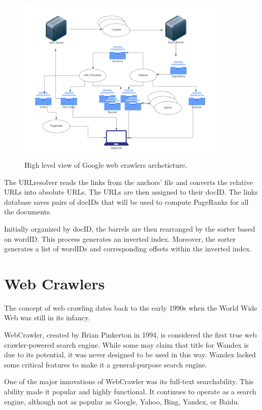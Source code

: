 \begin{figure}[h]	
     \centering
     \includegraphics[width=10cm]{images/google_arch.png}
     \caption{High level view of Google web crawlers archeticture.}
     \label{fig:google-arch}
\end{figure}

The URLresolver reads the links from the anchors' file and converts the relative URLs into absolute URLs. The URLs are then assigned to their docID. The links database saves pairs of docIDs that will be used to compute PageRanks for all the documents. 

Initially organized by docID, the barrels are then rearranged by the sorter based on wordID. This process generates an inverted index. Moreover, the sorter generates a list of wordIDs and corresponding offsets within the inverted index. 

\section{Web Crawlers}
The concept of web crawling dates back to the early 1990s when the World Wide Web was still in its infancy.

WebCrawler, created by Brian Pinkerton in 1994, is considered the first true web crawler-powered search engine. While some may claim that title for Wandex is due to its potential, it was never designed to be used in this way. Wandex lacked some critical features to make it a general-purpose search engine.

One of the major innovations of WebCrawler was its full-text searchability. This ability made it popular and highly functional. It continues to operate as a search engine, although not as popular as Google, Yahoo, Bing, Yandex, or Baidu.

